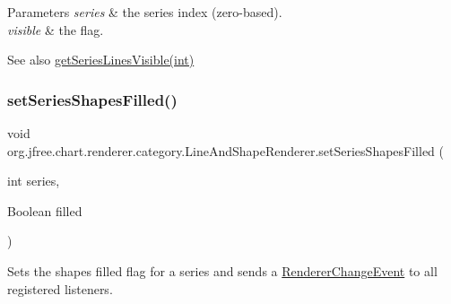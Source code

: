 \begin{DoxyParams}{Parameters}
{\em series} & the series index (zero-\/based). \\
\hline
{\em visible} & the flag.\\
\hline
\end{DoxyParams}
\begin{DoxySeeAlso}{See also}
\mbox{\hyperlink{classorg_1_1jfree_1_1chart_1_1renderer_1_1category_1_1_line_and_shape_renderer_a644c14daf7af65eb496c489825f639d3}{get\+Series\+Lines\+Visible(int)}} 
\end{DoxySeeAlso}
\mbox{\label{classorg_1_1jfree_1_1chart_1_1renderer_1_1category_1_1_line_and_shape_renderer_aee4dbdbf4c584e0d2d9ff04f6e668279}} 
\subsubsection{\texorpdfstring{set\+Series\+Shapes\+Filled()}{setSeriesShapesFilled()}\hspace{0.1cm}{\footnotesize\ttfamily [1/2]}}
{\footnotesize\ttfamily void org.\+jfree.\+chart.\+renderer.\+category.\+Line\+And\+Shape\+Renderer.\+set\+Series\+Shapes\+Filled (\begin{DoxyParamCaption}\item[{int}]{series,  }\item[{Boolean}]{filled }\end{DoxyParamCaption})}

Sets the \textquotesingle{}shapes filled\textquotesingle{} flag for a series and sends a \mbox{\hyperlink{}{Renderer\+Change\+Event}} to all registered listeners.


